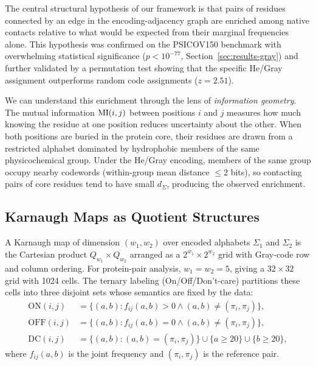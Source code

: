 The central structural hypothesis of our framework is that pairs of residues
connected by an edge in the encoding-adjacency graph are enriched among
native contacts relative to what would be expected from their marginal
frequencies alone.  This hypothesis was confirmed on the PSICOV150 benchmark
with overwhelming statistical significance ($p < 10^{-77}$,
Section~\ref{sec:results-gray}) and further validated by a permutation test
showing that the specific He/Gray assignment outperforms random code
assignments ($z = 2.51$).

We can understand this enrichment through the lens of \emph{information
	geometry}.  The mutual information $\mathrm{MI}(i,j)$ between positions $i$ and $j$
measures how much knowing the residue at one position reduces uncertainty
about the other.  When both positions are buried in the protein core, their
residues are drawn from a restricted alphabet dominated by hydrophobic
members of the same physicochemical group.  Under the He/Gray encoding,
members of the same group occupy nearby codewords (within-group mean distance
$\leq 2$ bits), so contacting pairs of core residues tend to have small
$d_\Sigma$, producing the observed enrichment.

\subsection{Karnaugh Maps as Quotient Structures}

A Karnaugh map of dimension $(w_1, w_2)$ over encoded alphabets $\Sigma_1$
and $\Sigma_2$ is the Cartesian product $Q_{w_1} \times Q_{w_2}$ arranged as
a $2^{w_1} \times 2^{w_2}$ grid with Gray-code row and column ordering.  For
protein-pair analysis, $w_1 = w_2 = 5$, giving a $32 \times 32$ grid with
1024 cells.  The ternary labeling (On/Off/Don't-care) partitions these cells
into three disjoint sets whose semantics are fixed by the data:
\begin{align}
	\mathrm{ON}(i,j)  & = \{(a,b) : f_{ij}(a,b) > 0 \wedge (a,b) \neq
	(\pi_i, \pi_j)\},                                                 \\
	\mathrm{OFF}(i,j) & = \{(a,b) : f_{ij}(a,b) = 0 \wedge (a,b) \neq
	(\pi_i, \pi_j)\},                                                 \\
	\mathrm{DC}(i,j)  & = \{(a,b) : (a,b) = (\pi_i, \pi_j)\}
	\cup \{a \geq 20\} \cup \{b \geq 20\},
\end{align}
where $f_{ij}(a,b)$ is the joint frequency and $(\pi_i, \pi_j)$ is the
reference pair.

